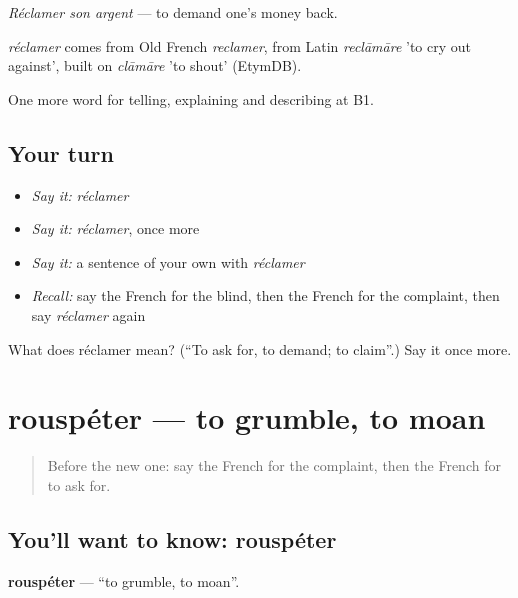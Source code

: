 \emph{Réclamer son argent} — to demand one's money back.

\begin{cousinweb}
\emph{réclamer} comes from Old French \emph{reclamer}, from Latin \emph{reclāmāre} 'to cry out against', built on \emph{clāmāre} 'to shout' (EtymDB).
\end{cousinweb}

\begin{grammarlens}[title={What you've built}]
One more word for telling, explaining and describing at B1.
\end{grammarlens}

\subsection*{Your turn}
\begin{itemize}
\raggedright
  \item \emph{Say it:} \emph{réclamer}
  \item \emph{Say it:} \emph{réclamer}, once more
  \item \emph{Say it:} a sentence of your own with \emph{réclamer}
  \item \emph{Recall:} say the French for the blind, then the French for the complaint, then say \emph{réclamer} again
\end{itemize}

\begin{tcolorbox}[breakable,colback=teal!4,colframe=teal!35!black,title={Before you move on}]
What does réclamer mean? (\textquotedblleft{}To ask for, to demand; to claim\textquotedblright{}.) Say it once more.
\end{tcolorbox}
\section[rouspéter]{rouspéter — to grumble, to moan}

\label{lesson:FR-C431-rouspeter}



\begin{quote}
Before the new one: say the French for the complaint, then the French for to ask for.
\end{quote}

\subsection*{You'll want to know: rouspéter}
\textbf{rouspéter} — \textquotedblleft{}to grumble, to moan\textquotedblright{}.


